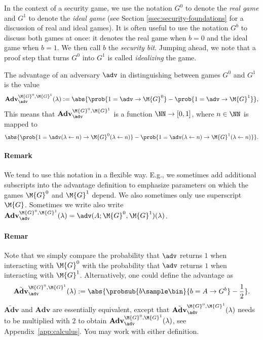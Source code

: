 In the context of a security game, we use the notation $G^0$ to denote the \emph{real game} and $G^1$ to denote the \emph{ideal game} (see Section \ref{ssec:security-foundations} for a discussion of real and ideal games). It is often useful to use the notation $G^b$ to discuss both games at once: it denotes the real game when $b=0$ and the ideal game when $b=1$. We then call $b$ the \emph{security bit}. Jumping ahead, we note that a proof step that turns $G^0$ into $G^1$ is called \emph{idealizing} the game.

\begin{definition}[Advantage]
	The advantage of an adversary $\adv$ in distinguishing between games $G^0$ and $G^1$ is the value
	\[{\mathbf{Adv}}_{\adv}^{\M{G}^0,\M{G}^1}(\lambda) := \abs{\prob{1=\adv \circ \M{G}^0} - \prob{1 = \adv \circ \M{G}^1}},\]
	This means that ${\mathbf{Adv}}_{\adv}^{\M{G}^0,\M{G}^1}$ is a function $\NN\rightarrow [0,1]$, where $n\in\NN$ is mapped to
	\begin{equation}\label{defeq:advantage}
		\abs{\prob{1=\adv(\lambda\gets n) \circ \M{G}^0(\lambda\gets n)} - \prob{1 = \adv(\lambda\gets n) \circ \M{G}^1(\lambda\gets n)}}.
	\end{equation}
\end{definition}
\paragraph{Remark} We tend to use this notation in a flexible way. E.g., we sometimes add additional subscripts into the advantage definition to emphasize parameters on which the games $\M{G}^0$ and  $\M{G}^1$ depend. We also sometimes only use superscript $\M{G}$. Sometimes we write also write ${\mathbf{Adv}}_{\adv}^{\M{G}^0,\M{G}^1}(\lambda) = \adv(A; \M{G}^0, \M{G}^1)(\lambda)$.
\paragraph{Remar} Note that we simply compare the probability that $\adv$ returns $1$ when interacting with $\M{G}^0$ with the probability that $\adv$ returns $1$ when interacting with $\M{G}^1$. Alternatively, one could define the advantage as
\[\tilde{\textbf{Adv}}_{\adv}^{\M{G}^0,\M{G}^1}(\lambda):=\abs{\probsub{b\sample\bin}{b = A \circ G^b} - \frac{1}{2}}.\]
$\tilde{\textbf{Adv}}$ and $\textbf{Adv}$ are essentially equivalent, except that $\tilde{\textbf{Adv}}^{\M{G}^0,\M{G}^1}_{\adv}(\lambda)$ needs to be multiplied with $2$ to obtain $\textbf{Adv}^{\M{G}^0,\M{G}^1}_{\adv}(\lambda)$, see Appendix~\ref{app:calculus}. You may work with either definition.

